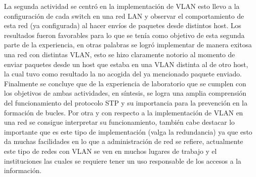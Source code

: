 \documentclass[spanish]{udpreport}
\begin{document}
La segunda actividad se centró en la implementación de VLAN esto llevo a la configuración de cada switch en una red LAN y observar el comportamiento de esta red (ya configurada) al hacer envíos de paquetes desde distintos host. Los resultados fueron favorables para lo que se tenía como objetivo de esta segunda parte de la experiencia, en otras palabras  se logró implementar de manera exitosa una red con distintas VLAN, esto se hizo claramente notorio al momento de enviar paquetes desde un host que estaba en una VLAN distinta al de otro host, la cual tuvo como resultado la no acogida del ya mencionado paquete enviado.\\

Finalmente se concluye que de la experiencia de laboratorio que se cumplen con los objetivos de ambas actividades, en síntesis, se logra una amplia comprensión del funcionamiento del protocolo STP y su importancia para la prevención en la formación de bucles. Por otra y con respecto a la implementación de VLAN en una red se consigue interpretar su funcionamiento, también cabe destacar lo importante que es este tipo de implementación (valga la redundancia) ya que esto da muchas facilidades en lo que a administración de red se refiere, actualmente este tipo de redes con VLAN se ven en muchos lugares de trabajo y el instituciones las cuales se requiere tener un uso responsable de los accesos a la información.
\end{document}
